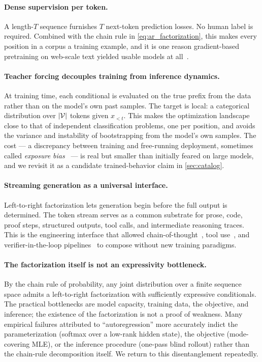 \paragraph{Dense supervision per token.}
A length-$T$ sequence furnishes $T$ next-token prediction losses.
No human label is required.
Combined with the chain rule in \cref{eq:ar_factorization}, this makes every position in a corpus a training example, and it is one reason gradient-based pretraining on web-scale text yielded usable models at all~\citep{radford2018improving,brown2020language,kaplan2020scaling}.

\paragraph{Teacher forcing decouples training from inference dynamics.}
At training time, each conditional is evaluated on the true prefix from the data rather than on the model's own past samples.
The target is local: a categorical distribution over $|\mathcal{V}|$ tokens given $x_{<t}$.
This makes the optimization landscape close to that of independent classification problems, one per position, and avoids the variance and instability of bootstrapping from the model's own samples.
The cost --- a discrepancy between training and free-running deployment, sometimes called \emph{exposure bias}~\citep{bengio2015scheduled,ranzato2016sequence} --- is real but smaller than initially feared on large models, and we revisit it as a candidate trained-behavior claim in \cref{sec:catalog}.

\paragraph{Streaming generation as a universal interface.}
Left-to-right factorization lets generation begin before the full output is determined.
The token stream serves as a common substrate for prose, code, proof steps, structured outputs, tool calls, and intermediate reasoning traces.
This is the engineering interface that allowed chain-of-thought~\citep{wei2022chain}, tool use~\citep{schick2023toolformer}, and verifier-in-the-loop pipelines~\citep{cobbe2021training,lightman2024lets} to compose without new training paradigms.

\paragraph{The factorization itself is not an expressivity bottleneck.}
By the chain rule of probability, any joint distribution over a finite sequence space admits a left-to-right factorization with sufficiently expressive conditionals.
The practical bottlenecks are model capacity, training data, the objective, and inference;
the existence of the factorization is not a proof of weakness.
Many empirical failures attributed to ``autoregression'' more accurately indict the parameterization (softmax over a low-rank hidden state), the objective (mode-covering MLE), or the inference procedure (one-pass blind rollout) rather than the chain-rule decomposition itself.
We return to this disentanglement repeatedly.

